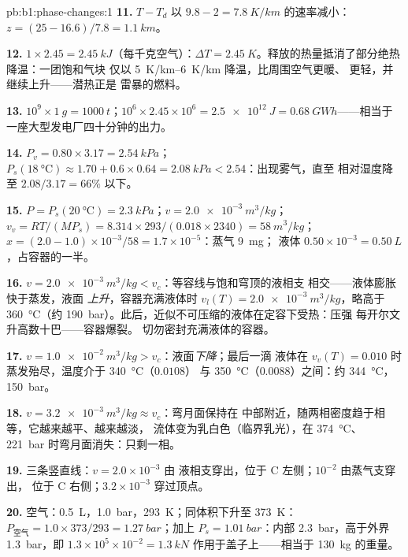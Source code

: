 \begin{solution}{pb:b1:phase-changes:1}
\textbf{11.} $T - T_d$ 以 $9.8 - 2 = \qty{7.8}{K/km}$ 的速率减小：$z = (25 - 16.6)/
7.8 = \qty{1.1}{km}$。

\textbf{12.} $1 \times 2.45 = \qty{2.45}{kJ}$（每千克空气）：$\Delta T =
\qty{2.45}{K}$。释放的热量抵消了部分绝热降温：一团饱和气块
仅以 \qtyrange{5}{6}{K/km} 降温，比周围空气更暖、
更轻，并继续上升——潜热正是
雷暴的燃料。

\textbf{13.} $10^9 \times \qty{1}{g} = \qty{1000}{t}$；$10^6 \times 2.45 \times 10^6 =
\qty{2.5e12}{J} = \qty{0.68}{GW h}$——相当于一座大型发电厂四十分钟的出力。

\textbf{14.} $P_v = 0.80 \times 3.17 = \qty{2.54}{kPa}$；$P_s(\qty{18}{\degreeCelsius})
\approx 1.70 + 0.6 \times 0.64 = \qty{2.08}{kPa} < 2.54$：出现雾气，直至
相对湿度降至 $2.08/3.17 = 66\%$ 以下。

\textbf{15.} $P = P_s(\qty{20}{\degreeCelsius}) = \qty{2.3}{kPa}$；$v = \qty{2.0e-3}{m^3/kg}$；
$v_v = RT/(MP_s) = 8.314 \times 293/(0.018 \times 2340) = \qty{58}{m^3/kg}$；$x =
(2.0 - 1.0) \times 10^{-3}/58 = 1.7 \times 10^{-5}$：蒸气 \qty{9}{mg}；
液体 $0.50 \times 10^{-3} = \qty{0.50}{L}$，占容器的一半。

\textbf{16.} $v = \qty{2.0e-3}{m^3/kg} < v_c$：等容线与饱和穹顶的液相支
相交——液体膨胀快于蒸发，液面
\emph{上升}，容器充满液体时 $v_l(T) =
\qty{2.0e-3}{m^3/kg}$，略高于 \qty{360}{\degreeCelsius}（约
\qty{190}{bar}）。此后，近似不可压缩的液体在定容下受热：压强
每开尔文升高数十巴——容器爆裂。
切勿密封充满液体的容器。

\textbf{17.} $v = \qty{1.0e-2}{m^3/kg} > v_c$：液面\emph{下降}；最后一滴
液体在 $v_v(T) = 0.010$ 时蒸发殆尽，温度介于 \qty{340}{\degreeCelsius}（$0.0108$）
与 \qty{350}{\degreeCelsius}（$0.0088$）之间：约 \qty{344}{\degreeCelsius}，
\qty{150}{bar}。

\textbf{18.} $v = \qty{3.2e-3}{m^3/kg} \approx v_c$：弯月面保持在
中部附近，随两相密度趋于相等，它越来越平、越来越淡，
流体变为乳白色（临界乳光），在 \qty{374}{\degreeCelsius}、
\qty{221}{bar} 时弯月面消失：只剩一相。

\textbf{19.} 三条竖直线：$v = 2.0 \times 10^{-3}$ 由
液相支穿出，位于 C 左侧；$10^{-2}$ 由蒸气支穿出，
位于 C 右侧；$3.2 \times 10^{-3}$ 穿过顶点。

\textbf{20.} 空气：\qty{0.5}{L}，\qty{1.0}{bar}，\qty{293}{K}；同体积下升至
\qty{373}{K}：$P_{\text{空气}} = 1.0 \times 373/293 = \qty{1.27}{bar}$；加上
$P_s = \qty{1.01}{bar}$：内部 \qty{2.3}{bar}，高于外界
\qty{1.3}{bar}，即 $1.3 \times 10^5 \times 10^{-2} = \qty{1.3}{kN}$ 作用于盖子上——相当于
\qty{130}{kg} 的重量。


\end{solution}
